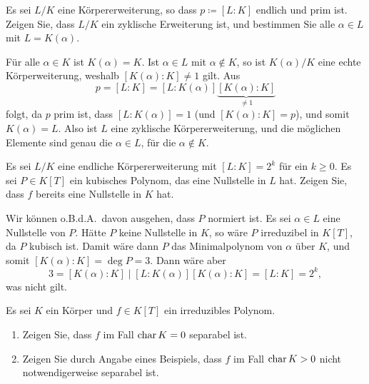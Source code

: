 \begin{question}
  Es sei $L/K$ eine Körpererweiterung, so dass $p \coloneqq [L : K]$ endlich und prim ist.
  Zeigen Sie, dass $L/K$ ein zyklische Erweiterung ist, und bestimmen Sie alle $\alpha \in L$ mit $L = K(\alpha)$.
\end{question}


\begin{solution}
  Für alle $\alpha \in K$ ist $K(\alpha) = K$.
  Ist $\alpha \in L$ mit $\alpha \notin K$, so ist $K(\alpha)/K$ eine echte Körperweiterung, weshalb $[K(\alpha) : K] \neq 1$ gilt.
  Aus
  \[
      p
    = [L : K]
    = [L : K(\alpha)] \underbrace{[K(\alpha) : K]}_{\neq 1}
  \]
  folgt, da $p$ prim ist, dass $[L : K(\alpha)] = 1$ (und $[K(\alpha) : K] = p$), und somit $K(\alpha) = L$.
  Also ist $L$ eine zyklische Körpererweiterung, und die möglichen Elemente sind genau die $\alpha \in L$, für die $\alpha \notin K$.
\end{solution}


\begin{question}
  Es sei $L/K$ eine endliche Körpererweiterung mit $[L : K] = 2^k$ für ein $k \geq 0$.
  Es sei $P \in K[T]$ ein kubisches Polynom, das eine Nullstelle in $L$ hat.
  Zeigen Sie, dass $f$ bereits eine Nullstelle in $K$ hat.
\end{question}


\begin{solution}
  Wir können o.B.d.A.\ davon ausgehen, dass $P$ normiert ist.
  Es sei $\alpha \in L$ eine Nullstelle von $P$.
  Hätte $P$ keine Nullstelle in $K$, so wäre $P$ irreduzibel in $K[T]$, da $P$ kubisch ist.
  Damit wäre dann $P$ das Minimalpolynom von $\alpha$ über $K$, und somit $[K(\alpha) : K] = \deg P = 3$.
  Dann wäre aber
  \[
          3
    =     [K(\alpha) : K]
    \mid  [L : K(\alpha)] [K(\alpha) : K]
    =     [L : K]
    =     2^k,
  \]
  was nicht gilt.
\end{solution}


\begin{question}
  Es sei $K$ ein Körper und $f \in K[T]$ ein irreduzibles Polynom.
  \begin{enumerate}
    \item
      Zeigen Sie, dass $f$ im Fall $\operatorname{char} K = 0$ separabel ist.
    \item
      Zeigen Sie durch Angabe eines Beispiels, dass $f$ im Fall $\operatorname{char} K > 0$ nicht notwendigerweise separabel ist.
  \end{enumerate}
\end{question}


